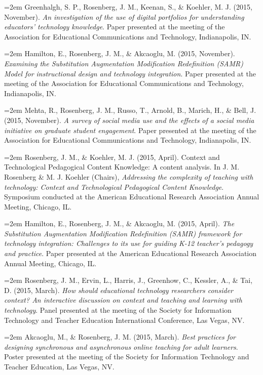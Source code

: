 \documentclass[14,]{article}
\begin{document}
\hangindent=2em Greenhalgh, S. P., Rosenberg, J. M., Keenan, S., \&
Koehler, M. J. (2015, November). \emph{An investigation of the use of
digital portfolios for understanding educators' technology knowledge}.
Paper presented at the meeting of the Association for Educational
Communications and Technology, Indianapolis, IN.

\hangindent=2em Hamilton, E., Rosenberg, J. M., \& Akcaoglu, M. (2015,
November). \emph{Examining the Substitution Augmentation Modification
Redefinition (SAMR) Model for instructional design and technology
integration}. Paper presented at the meeting of the Association for
Educational Communications and Technology, Indianapolis, IN.

\hangindent=2em Mehta, R., Rosenberg, J. M., Russo, T., Arnold, B.,
Marich, H., \& Bell, J. (2015, November). \emph{A survey of social media
use and the effects of a social media initiative on graduate student
engagement}. Paper presented at the meeting of the Association for
Educational Communications and Technology, Indianapolis, IN.

\hangindent=2em Rosenberg, J. M., \& Koehler, M. J. (2015, April).
Context and Technological Pedagogical Content Knowledge: A content
analysis. In J. M. Rosenberg \& M. J. Koehler (Chairs), \emph{Addressing
the complexity of teaching with technology: Context and Technological
Pedagogical Content Knowledge}. Symposium conducted at the American
Educational Research Association Annual Meeting, Chicago, IL.

\hangindent=2em Hamilton, E., Rosenberg, J. M., \& Akcaoglu, M. (2015,
April). \emph{The Substitution Augmentation Modification Redefinition
(SAMR) framework for technology integration: Challenges to its use for
guiding K-12 teacher's pedagogy and practice}. Paper presented at the
American Educational Research Association Annual Meeting, Chicago, IL.

\hangindent=2em Rosenberg, J. M., Ervin, L., Harris, J., Greenhow, C.,
Kessler, A., \& Tai, D. (2015, March). \emph{How should educational
technology researchers consider context? An interactive discussion on
context and teaching and learning with technology}. Panel presented at
the meeting of the Society for Information Technology and Teacher
Education International Conference, Las Vegas, NV.

\hangindent=2em Akcaoglu, M., \& Rosenberg, J. M. (2015, March).
\emph{Best practices for designing synchronous and asynchronous online
teaching for adult learners}. Poster presented at the meeting of the
Society for Information Technology and Teacher Education, Las Vegas, NV.
\end{document}
